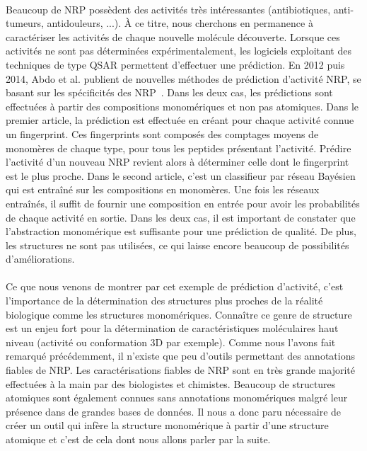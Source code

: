 \documentclass[12pt,french,twoside]{report}
\begin{document}
\paragraph{}Beaucoup de NRP possèdent des activités très intéressantes (antibiotiques, anti-tumeurs, antidouleurs, ...).
À ce titre, nous cherchons en permanence à caractériser les activités de chaque nouvelle molécule découverte.
Lorsque ces activités ne sont pas déterminées expérimentalement, les logiciels exploitant des techniques de type QSAR permettent d'effectuer une prédiction.
En 2012 puis 2014, Abdo et al. publient de nouvelles méthodes de prédiction d'activité NRP, se basant sur les spécificités des NRP~\cite{abdo_new_2012, abdo_prediction_2014}.
Dans les deux cas, les prédictions sont effectuées à partir des compositions monomériques et non pas atomiques.
Dans le premier article, la prédiction est effectuée en créant pour chaque activité connue un fingerprint.
Ces fingerprints sont composés des comptages moyens de monomères de chaque type, pour tous les peptides présentant l'activité.
Prédire l'activité d'un nouveau NRP revient alors à déterminer celle dont le fingerprint est le plus proche.
Dans le second article, c'est un classifieur par réseau Bayésien qui est entraîné sur les compositions en monomères.
Une fois les réseaux entraînés, il suffit de fournir une composition en entrée pour avoir les probabilités de chaque activité en sortie.
Dans les deux cas, il est important de constater que l'abstraction monomérique est suffisante pour une prédiction de qualité.
De plus, les structures ne sont pas utilisées, ce qui laisse encore beaucoup de possibilités d'améliorations.

\paragraph{}Ce que nous venons de montrer par cet exemple de prédiction d'activité, c'est l'importance de la détermination des structures plus proches de la réalité biologique comme les structures monomériques.
Connaître ce genre de structure est un enjeu fort pour la détermination de caractéristiques moléculaires haut niveau (activité ou conformation 3D par exemple).
Comme nous l'avons fait remarqué précédemment, il n'existe que peu d'outils permettant des annotations fiables de NRP.
Les caractérisations fiables de NRP sont en très grande majorité effectuées à la main par des biologistes et chimistes.
Beaucoup de structures atomiques sont également connues sans annotations monomériques malgré leur présence dans de grandes bases de données.
Il nous a donc paru nécessaire de créer un outil qui infère la structure monomérique à partir d'une structure atomique et c'est de cela dont nous allons parler par la suite.
\end{document}
